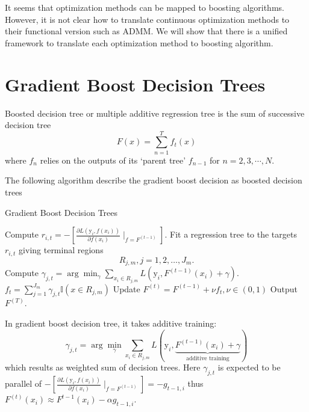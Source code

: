 \documentclass[UTF8]{article}
\begin{document}
It seems that optimization methods can be mapped to boosting algorithms.
However, it is not clear how to translate continuous optimization methods to their functional version such as ADMM.
We will show that there is a unified framework to translate each optimization method to boosting algorithm. 
\section{Gradient Boost Decision Trees}

Boosted decision tree or multiple additive regression tree is the sum of successive decision tree
$$F(x)=\sum_{n=1}^{T}f_{t}(x)$$
where $f_{n}$ relies on the outputs of its `parent tree' $f_{n-1}$ for $n=2, 3,\cdots, N$.

The following algorithm describe the  gradient boost decision  as  boosted decision trees

\begin{algorithm}[h]
\caption{Gradient Boost Decision Trees}
\begin{algorithmic}[1]
\STATE Compute $r_{i,t}=-{[\frac{\partial L(\mathrm{y}_i, f(x_i))}{\partial f(x_i)}\mid_{f=F^{(t-1)}}]}.$
\ENDFOR
\STATE  Fit a regression tree to the targets $r_{i,t}$   giving terminal regions
   $$R_{j,m}, j = 1, 2,\dots , J_m. $$
\STATE  Compute $\gamma_{j,t}=\arg\min_{\gamma}\sum_{x_i\in R_{j,m}}{L(\mathrm{y}_i, F^{(t-1)}(x_i)+\gamma)}$.
\ENDFOR
\STATE  $f_t={\sum}_{j=1}^{J_m}{\gamma}_{j, t} \mathbb{I}(x\in R_{j, m})$
\STATE Update $F^{(t)} = F^{(t-1)}+\nu f_t,\nu\in(0, 1)$
\ENDFOR
\STATE Output $F^{(T)}$.
\end{algorithmic}
\end{algorithm}

%
%

In gradient boost decision tree, it takes additive training:
$$\gamma_{j,t}=\arg\min_{\gamma}\sum_{x_i\in R_{j,m}}L(\mathrm{y}_i, \underbrace{F^{(t-1)}(x_i)+\gamma}_{\text{additive training}})$$
which results as weighted sum of decision trees.
Here $\gamma_{j, t}$ is expected to be parallel of $-{[\frac{\partial L(\mathrm{y}_i, f(x_i))}{\partial f(x_i)}\mid_{f=F^{(t-1)}}]}= -g_{t-1, i}$
thus $F^{(t)}(x_i)\approx F^{t-1}(x_i)-\alpha g_{t-1, i}$.
\end{document}
